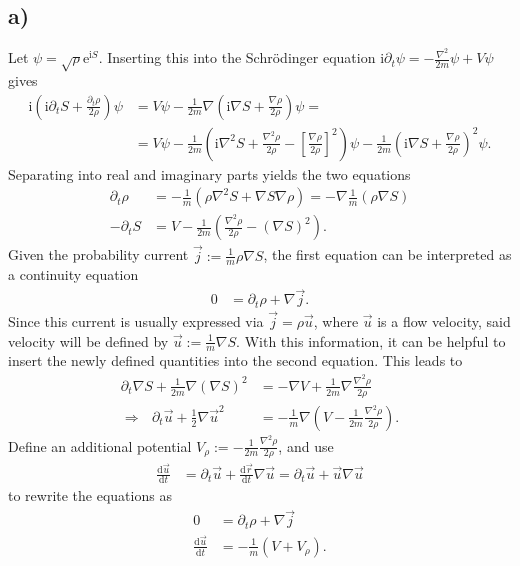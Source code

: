 \documentclass[english, parskip=full]{scrartcl}
\newcommand{\kla}{}
\newcommand{\klam}{}
\newcommand{\tecxt}{}
\renewcommand{\i}{\text{i}}
\newcommand{\e}{\text{e}}
\begin{document}
\subsection*{a)}
Let $\psi=\sqrt{\rho}\e^{\i S}$. 
Inserting this into the Schrödinger equation $\i\partial_t\psi=-\frac{\nabla^2}{2m}\psi +V\psi$ gives
\begin{align}
\i\kla\left( \i\partial_tS +\frac{\partial_t\rho}{2\rho}\right)\psi&=V\psi -\frac{1}{2m}\nabla\kla\left( \i\nabla S+\frac{\nabla\rho}{2\rho} \right)\psi=\\
&=V\psi-\frac{1}{2m}\kla\left( \i\nabla^2S+\frac{\nabla^2\rho}{2\rho}-\klam\left[ \frac{\nabla\rho}{2\rho} \right]^2 \right)\psi-\frac{1}{2m}\kla\left( \i\nabla S+\frac{\nabla\rho}{2\rho} \right)^2\psi.
\end{align}
Separating into real and imaginary parts yields the two equations
\begin{align}
\partial_t\rho&=-\frac{1}{m}\kla\left( \rho\nabla^2S+\nabla S\nabla\rho \right)=-\nabla\frac{1}{m}\kla\left( \rho\nabla S \right)\\
-\partial_t S&=V-\frac{1}{2m}\kla\left( \frac{\nabla^2\rho}{2\rho}- (\nabla S)^2 \right).
\end{align}
Given the probability current $\vec{j}:=\frac{1}{m}\rho\nabla S$, the first equation can be interpreted as a continuity equation
\begin{align}
0&=\partial_t\rho+\nabla\vec{j}.
\end{align}
Since this current is usually expressed via $\vec{j}=\rho\vec{u}$, where $\vec{u}$ is a flow velocity, said velocity will be defined by $\vec{u} := \frac{1}{m}\nabla S$.
With this information, it can be helpful to insert the newly defined quantities into the second equation. 
This leads to
\begin{align}
\partial_t\nabla S+\frac{1}{2m}\nabla\kla\left( \nabla S \right)^2&=-\nabla V+\frac{1}{2m}\nabla\frac{\nabla^2\rho}{2\rho}\\
\Rightarrow\ \ \ \partial_t\vec{u}+\frac{1}{2}\nabla\vec{u}^2&=-\frac{1}{m}\nabla\kla\left( V-\frac{1}{2m}\frac{\nabla^2\rho}{2\rho} \right).
\end{align}
Define an additional potential $V_\rho:=-\frac{1}{2m}\frac{\nabla^2\rho}{2\rho}$, and use 
\begin{align}
\frac{\tecxt\text{d}\vec{u}}{\tecxt\text{d}t}&=\partial_t\vec{u} + \frac{\tecxt\text{d}\vec{r}}{\tecxt\text{d}t}\nabla\vec{u}=\partial_t\vec{u} + \vec{u}\nabla\vec{u}
\end{align}
to rewrite the equations as
\begin{align}
0&=\partial_t\rho + \nabla\vec{j}\\
\frac{\tecxt\text{d}\vec{u}}{\tecxt\text{d}t}&=-\frac{1}{m}(V+V_\rho).
\end{align}
\end{document}
